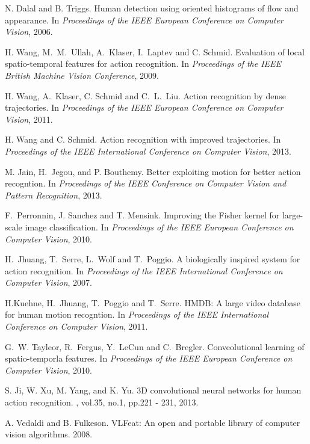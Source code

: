 \documentclass[11pt,twocolumn,twoside]{IEEEtran}
\begin{document}
\begin{thebibliography}{1}
N. Dalal and B. Triggs.
\newblock Human detection using oriented histograms of flow and appearance.
\newblock In {\em Proceedings of the IEEE European Conference on Computer Vision}, 2006.


H. Wang, M.~M.~Ullah, A.~Klaser, I.~Laptev and C. Schmid.
\newblock Evaluation of local spatio-temporal features for action recognition.
\newblock In {\em Proceedings of the IEEE British Machine Vision Conference}, 2009.


H. Wang, A.~Klaser, C. Schmid and C.~L.~Liu.
\newblock Action recognition by dense trajectories.
\newblock In {\em Proceedings of the IEEE European Conference on Computer Vision}, 2011.

H. Wang and C. Schmid.
\newblock Action recognition with improved trajectories.
\newblock In {\em Proceedings of the IEEE International Conference on Computer Vision}, 2013.


M. Jain, H.~Jegou, and P. Bouthemy.
\newblock Better exploiting motion for better action recogntion.
\newblock In {\em Proceedings of the IEEE Conference on Computer Vision and Pattern Recognition}, 2013.


F.~Perronnin, J. Sanchez and T. Mensink.
\newblock Improving the Fisher kernel for large-scale image classification.
\newblock In {\em Proceedings of the IEEE European Conference on Computer Vision}, 2010.


H.~Jhuang, T.~Serre, L.~Wolf and T.~Poggio.
\newblock A biologically inspired system for action recognition.
\newblock In {\em Proceedings of the IEEE International Conference on Computer Vision}, 2007.


H.Kuehne, H.~Jhuang, T.~Poggio and T.~Serre.
\newblock HMDB: A large video database for human motion recogntion.
\newblock In {\em Proceedings of the IEEE International Conference on Computer Vision}, 2011.

G.~W. Tayleor, R.~Fergus, Y.~LeCun and C.~Bregler.
\newblock Conveolutional learning of spatio-temporla features.
\newblock In {\em Proceedings of the IEEE European Conference on Computer Vision}, 2010.

S. Ji, W. Xu, M. Yang, and K. Yu.
\newblock 3D convolutional neural networks for human action recognition.
, vol.35, no.1, pp.221 - 231, 2013.

A. Vedaldi and B. Fulkeson.
\newblock VLFeat: An open and portable library of computer vision algorithms. 2008.

\end{thebibliography}
\end{document}
